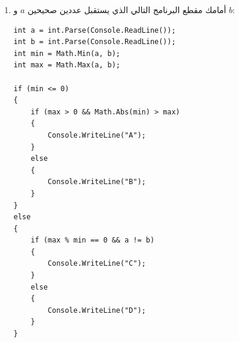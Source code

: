 \documentclass[14pt]{extarticle}
\begin{document}
\begin{enumerate}[itemsep=2.2em]
\begin{boxSolution}
\textbf{حل الفرع ب (أمثلة لإجابات صحيحة):}
\begin{itemize}[nosep]
    \item لطباعة $A$ مع $x < 0$: يجب أن يكون $x^2 < y$، مثل: $x = -2,\ y = 10$ (حيث $p = -6$).
    \item لطباعة $B$ مع $x \ne y$: يجب أن يكون $p = 0$ (أي $y = x^2$)، مثل: $x = 2,\ y = 4$ (أو $x = 5,\ y = 25$).
    \item لطباعة $B$ مع $p > 0$: يجب أن يكون $x = y$ و $x^2 - x > 0$، مثل: $x = 3,\ y = 3$ (حيث $p = 6$).
    \item لطباعة $C$ مع $x > 0$: يجب أن يكون $y \le 0$، مثل: $x = 2,\ y = -3$.
    \item لطباعة $D$ مع $x < y$: يجب أن يكون $x > 0$ و $y > 0$ و $x < y < x^2$، مثل: $x = 3,\ y = 6$ (حيث $p = 3$).
\end{itemize}
\end{boxSolution}
\fi
\filbreak

\item
أمامك مقطع البرنامج التالي الذي يستقبل عددين صحيحين $a$ و $b$:

\begin{boxCode}
\begin{english}
\begin{verbatim}
int a = int.Parse(Console.ReadLine());
int b = int.Parse(Console.ReadLine());
int min = Math.Min(a, b);
int max = Math.Max(a, b);

if (min <= 0)
{
    if (max > 0 && Math.Abs(min) > max)
    {
        Console.WriteLine("A");
    }
    else
    {
        Console.WriteLine("B");
    }
}
else
{
    if (max % min == 0 && a != b)
    {
        Console.WriteLine("C");
    }
    else
    {
        Console.WriteLine("D");
    }
}
\end{verbatim}
\end{english}
\end{boxCode}


\end{enumerate}
\end{document}
